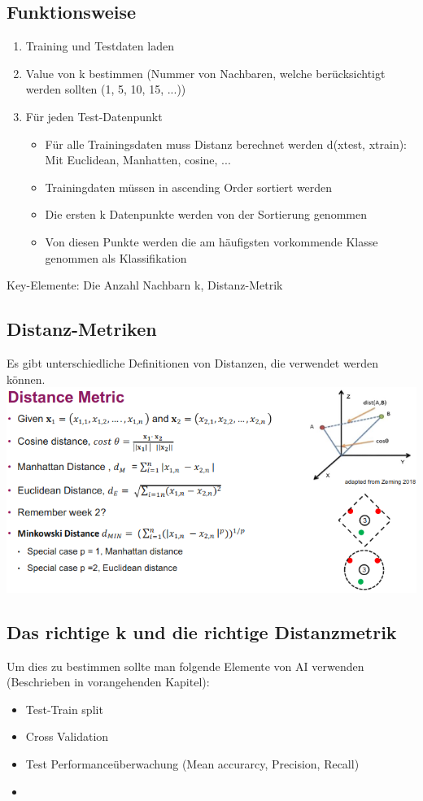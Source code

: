 \subsection{Funktionsweise}
\begin{enumerate}
\item Training und Testdaten laden
\item Value von k bestimmen (Nummer von Nachbaren, welche berücksichtigt werden sollten (1, 5, 10, 15, ...))
\item Für jeden Test-Datenpunkt
\begin{itemize}
\item Für alle Trainingsdaten muss Distanz berechnet werden d(xtest, xtrain): Mit Euclidean, Manhatten, cosine, ...
\item Trainingdaten müssen in ascending Order sortiert werden
\item Die ersten k Datenpunkte werden von der Sortierung genommen
\item Von diesen Punkte werden die am häufigsten vorkommende Klasse genommen als Klassifikation
\end{itemize}
\end{enumerate}
Key-Elemente: Die Anzahl Nachbarn k, Distanz-Metrik
\subsection{Distanz-Metriken}
Es gibt unterschiedliche Definitionen von Distanzen, die verwendet werden können.
\includegraphics[width=\linewidth]{img/distance_metric.png}
\subsection{Das richtige k und die richtige Distanzmetrik}
Um dies zu bestimmen sollte man folgende Elemente von AI verwenden (Beschrieben in vorangehenden Kapitel):
\begin{itemize}
\item Test-Train split
\item Cross Validation
\item Test Performanceüberwachung (Mean accurarcy, Precision, Recall)
\item 
\end{itemize}
